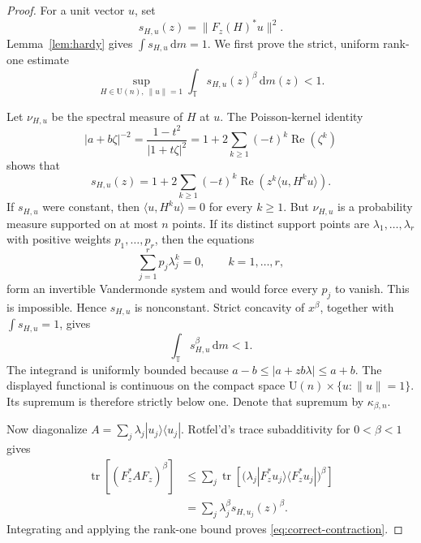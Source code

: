 \documentclass[11pt]{article}
\theoremstyle{remark}
\newcommand{\T}{\mathbb T}
\newcommand{\dd}{\,\mathrm d}
\newcommand{\tr}{\operatorname{tr}}
\newcommand{\U}{\mathrm U}
\begin{document}
\begin{proof}
For a unit vector $u$, set
\begin{equation}
 s_{H,u}(z)=\|F_z(H)^*u\|^2.
 \label{eq:s}
\end{equation}
Lemma~\ref{lem:hardy} gives $\int s_{H,u}\dd m=1$.  We first prove the
strict, uniform rank-one estimate
\begin{equation}
 \sup_{H\in\U(n),\ \|u\|=1}
 \int_\T s_{H,u}(z)^\beta\dd m(z)<1.
 \label{eq:rank-one-uniform}
\end{equation}

Let $\nu_{H,u}$ be the spectral measure of $H$ at $u$.  The Poisson-kernel
identity
\begin{equation}
 |a+b\zeta|^{-2}
 =\frac{1-t^2}{|1+t\zeta|^2}
 =1+2\sum_{k\geq1}(-t)^k\operatorname{Re}(\zeta^k)
 \label{eq:poisson}
\end{equation}
shows that
\begin{equation}
 s_{H,u}(z)
 =1+2\sum_{k\geq1}(-t)^k
   \operatorname{Re}\!\left(z^k\langle u,H^ku\rangle\right).
 \label{eq:s-fourier}
\end{equation}
If $s_{H,u}$ were constant, then
$\langle u,H^ku\rangle=0$ for every $k\geq1$.  But $\nu_{H,u}$ is a
probability measure supported on at most $n$ points.  If its distinct support
points are $\lambda_1,\ldots,\lambda_r$ with positive weights
$p_1,\ldots,p_r$, then the equations
\[
 \sum_{j=1}^r p_j\lambda_j^k=0,
 \qquad k=1,\ldots,r,
\]
form an invertible Vandermonde system and would force every $p_j$ to vanish.
This is impossible.  Hence $s_{H,u}$ is nonconstant.  Strict concavity of
$x^\beta$, together with $\int s_{H,u}=1$, gives
\[
 \int_\T s_{H,u}^\beta\dd m<1.
\]
The integrand is uniformly bounded because
$a-b\leq|a+zb\lambda|\leq a+b$.  The displayed functional is continuous on
the compact space $\U(n)\times\{u:\|u\|=1\}$.  Its supremum is therefore
strictly below one.  Denote that supremum by $\kappa_{\beta,n}$.

Now diagonalize
$A=\sum_j\lambda_j|u_j\rangle\langle u_j|$.  Rotfel'd's trace
subadditivity for $0<\beta<1$ gives
\begin{align*}
 \tr[(F_z^*AF_z)^\beta]
 &\leq \sum_j
 \tr\!\left[
   \bigl(\lambda_j|F_z^*u_j\rangle\langle F_z^*u_j|\bigr)^\beta
 \right]\\
 &=\sum_j\lambda_j^\beta s_{H,u_j}(z)^\beta.
\end{align*}
Integrating and applying the rank-one bound proves
\eqref{eq:correct-contraction}.
\end{proof}
\end{document}
